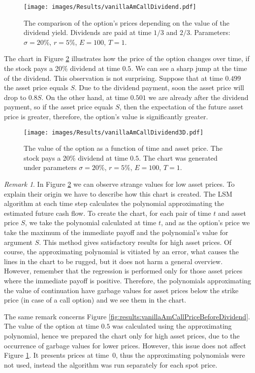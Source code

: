 \documentclass[a4paper,11pt, twoside]{book}
\theoremstyle{definition}
\theoremstyle{remark}
\newtheorem{remark}{Remark}[chapter]
\begin{document}
\begin{figure}[!htb]
\centering
 \texttt{[image: images/Results/vanillaAmCallDividend.pdf]}
\caption{The comparison of the option's prices depending on the value of the dividend yield. Dividends are paid at time $1/3$ and $2/3$. Parameters: $\sigma = 20\%$, $r=5\%$, $E=100$, $T=1$.}
\label{fig:results:vanillaAmCallDividend}
\end{figure}

The chart in Figure \ref{fig:results:vanillaAmCallDividend3D} illustrates how the price of the option  changes over time, if the stock pays a 20\% dividend at time $0.5$. We can see a sharp jump at the time of the dividend. This observation is not surprising. Suppose that at time $0.499$ the asset price equals $S$. Due to the dividend payment, soon the asset price will drop to $0.8S$. On the other hand, at time $0.501$ we are already after the dividend payment, so if the asset price equals $S$, then the expectation of the future asset price is greater, therefore, the option's value is significantly greater.


\begin{figure}[!htb]
\centering
 \texttt{[image: images/Results/vanillaAmCallDividend3D.pdf]}
\caption{The value of the option as a function of time and asset price. The stock pays a 20\% dividend at time $0.5$. The chart was generated under parameters $\sigma = 20\%$, $r=5\%$, $E=100$, $T=1$.}
\label{fig:results:vanillaAmCallDividend3D}
\end{figure}

\begin{remark}
 In Figure \ref{fig:results:vanillaAmCallDividend3D} we can observe strange values for low asset prices. To explain their origin we have to describe how this chart is created. The LSM algorithm at each time step calculates the polynomial approximating the estimated future cash flow. To create the chart, for each pair of time $t$ and asset price $S$, we take the polynomial calculated at time $t$, and as the option's price we take the maximum of the immediate payoff and the polynomial's value for argument $S$. This method gives satisfactory results for high asset prices. Of course, the approximating polynomial is vitiated by an error, what causes the lines in the chart to be rugged, but it does not harm a general overview. However, remember that the regression is performed only for those asset prices where the immediate payoff is positive. Therefore, the polynomials approximating the value of continuation have garbage values for asset prices below the strike price (in case of a call option) and we see them in the chart. 
 
 The same remark concerns Figure \ref{fig:results:vanillaAmCallPriceBeforeDividend}. The value of the option at time $0.5$ was calculated using the approximating polynomial, hence we prepared the chart only for high asset prices, due to the occurrence of garbage values for lower prices. However, this issue does not affect Figure \ref{fig:results:vanillaAmCallDividend}. It presents prices at time~0, thus the approximating polynomials were not used, instead the algorithm was run separately for each spot price.
\end{remark}
\end{document}

